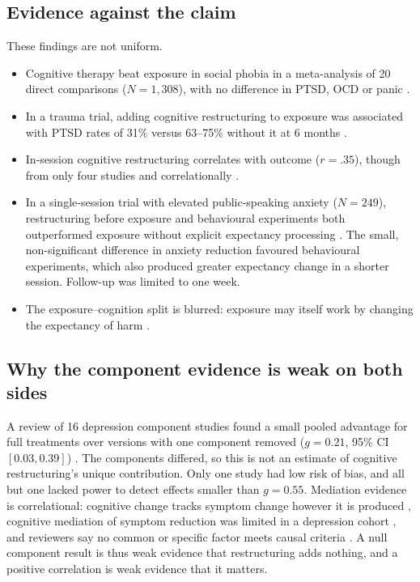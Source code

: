 \subsection{Evidence against the claim}
These findings are not uniform.
\begin{itemize}
\item Cognitive therapy beat exposure in social phobia in a meta-analysis of 20 direct comparisons ($N=1{,}308$), with no difference in PTSD, OCD or panic \citep{ougrin2011exposure}.
\item In a trauma trial, adding cognitive restructuring to exposure was associated with PTSD rates of 31\% versus 63--75\% without it at 6 months \citep{bryant2008cr}.
\item In-session cognitive restructuring correlates with outcome ($r=.35$), though from only four studies and correlationally \citep{ezawa2023restructuring}.
\item In a single-session trial with elevated public-speaking anxiety ($N=249$), restructuring before exposure and behavioural experiments both outperformed exposure without explicit expectancy processing \citep{johnco2025restructuring}.
The small, non-significant difference in anxiety reduction favoured behavioural experiments, which also produced greater expectancy change in a shorter session.
Follow-up was limited to one week.
\item The exposure--cognition split is blurred: exposure may itself work by changing the expectancy of harm \citep{hofmann2008extinction}.
\end{itemize}

\subsection{Why the component evidence is weak on both sides}
A review of 16 depression component studies found a small pooled advantage for full treatments over versions with one component removed ($g=0.21$, 95\% CI $[0.03,0.39]$) \citep{cuijpers2017components}.
The components differed, so this is not an estimate of cognitive restructuring's unique contribution.
Only one study had low risk of bias, and all but one lacked power to detect effects smaller than $g=0.55$.
Mediation evidence is correlational: cognitive change tracks symptom change however it is produced \citep{cristea2015dysfunctional,lorenzoluaces2015complicated}, cognitive mediation of symptom reduction was limited in a depression cohort \citep[median $r=.06$;][]{vittengl2014mediators}, and reviewers say no common or specific factor meets causal criteria \citep{kazdin2007mediators,cuijpers2019commonfactors}.
A null component result is thus weak evidence that restructuring adds nothing, and a positive correlation is weak evidence that it matters.

